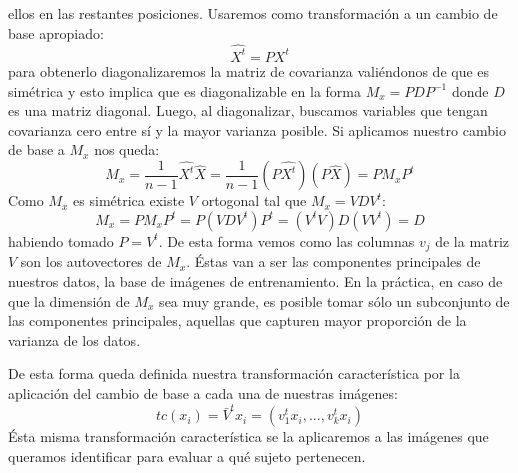 ellos en las restantes posiciones. Usaremos como transformación a un cambio de base apropiado:
\begin{displaymath}
 \hat{X^t} = PX^t
\end{displaymath}
para obtenerlo diagonalizaremos la matriz de covarianza valiéndonos de que es simétrica y esto implica que es diagonalizable en la forma 
$M_x = PDP^{-1}$ donde $D$ es una matriz diagonal.  Luego, al diagonalizar, buscamos variables que tengan covarianza cero entre sí y la 
mayor varianza posible. Si aplicamos nuestro cambio de base a $M_x$ nos queda:
\begin{displaymath}
 M_x = \frac{1}{n-1}\hat{X^t}\hat{X} = \frac{1}{n-1}(P\hat{X^t})(P\hat{X}) = PM_xP^t
\end{displaymath}
Como $M_x$ es simétrica existe $V$ ortogonal tal que $M_x = VD{V^t}$:
\begin{displaymath}
 M_x = PM_xP^t = P(VD{V^t})P^t = ({V^t}V)D(V{V^t}) = D
\end{displaymath}
habiendo tomado $P = V^t$. De esta forma vemos como las columnas $v_j$ de la matriz $V$ son los autovectores de $M_x$. Éstas van a ser
las componentes principales de nuestros datos, la base de imágenes de entrenamiento. En la práctica, en caso de que la dimensión 
de $M_x$ sea muy grande, es posible tomar sólo un subconjunto de las componentes principales, aquellas que capturen mayor proporción
de la varianza de los datos.
\par
De esta forma queda definida nuestra transformación característica por la aplicación del cambio de base a cada una de nuestras imágenes:
\begin{displaymath}
 tc(x_i) = \bar{V}^{t}x_i = (v_1^{t}x_i,...,v_k^{t}x_i)
\end{displaymath}
Ésta misma transformación característica se la aplicaremos a las imágenes que queramos identificar para evaluar a qué sujeto pertenecen.



